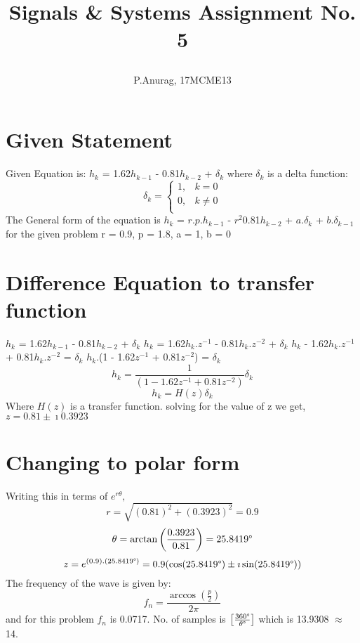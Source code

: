 \documentclass[a4paper,12pt]{article}
\title{
  \begin{large}
    Signals \& Systems
    Assignment No. 5
  \end{large}
}
\author{P.Anurag, 17MCME13}
\begin{document}
\maketitle

  \section{Given Statement}
    Given Equation is: $h_k$ = 1.62$h_{k-1}$ - 0.81$h_{k-2}$ + $\delta_k$
    \newline
    where $\delta_k$ is a delta function:
    \[
    \delta_k = 
      \left\{
        \begin{array}{ll}
          1, & k = 0 \\
          0, & k \neq 0\\
        \end{array}
      \right.
    \]
    The General form of the equation is $h_k$ = $r.p.h_{k-1}$ - $r^2$0.81$h_{k-2}$ +  $a.\delta_k$ + $b.\delta_{k-1}$
    for the given problem r = 0.9, p = 1.8, a = 1, b = 0

    \section{Difference Equation to transfer function}
      $h_k$ = 1.62$h_{k-1}$ - 0.81$h_{k-2}$ + $\delta_k$
      \newline
      $h_k$ = 1.62$h_k.z^{-1}$ - 0.81$h_k.z^{-2}$ + $\delta_k$
      \newline
      $h_k$ - 1.62$h_k.z^{-1}$ + 0.81$h_k.z^{-2}$ = $\delta_k$
      \newline
      $h_k$.(1 - 1.62$z^{-1}$ + 0.81$z^{-2}$) = $\delta_k$
      \newline
        \begin{equation}
          h_k = \frac{1}{(1 - 1.62z^{-1} + 0.81z^{-2})}\delta_k
        \end{equation}
        \begin{equation}
          h_k = H(z)\delta_k
        \end{equation}
      Where $H(z)$ is a transfer function.
      \newline
      solving for the value of z we get, 
      $z = 0.81\pm\imath0.3923$

    \section{Changing to polar form}
      Writing this in terms of $e^{r\theta},$\newline
      \[
        r = \sqrt{(0.81)^2 + (0.3923)^2}
          = 0.9
      \]
      \[
        \theta = \arctan\left(\frac{0.3923}{0.81}\right)
               = 25.8419\degree
      \]
      \begin{equation}
        z = e^{(0.9).(25.8419\degree)} = 0.9(\cos(25.8419\degree)\pm\imath\sin(25.8419\degree))
      \end{equation}
      The frequency of the wave is given by:
      \[
      f_n = \frac{\arccos(\frac{p}{2})}{2\pi}
      \]
      and for this problem $f_n$ is 0.0717.\newline
      No. of samples is $\left[\frac{360\degree}{\theta\degree}\right]$ which is 13.9308 $\approx$ 14.
\end{document}
